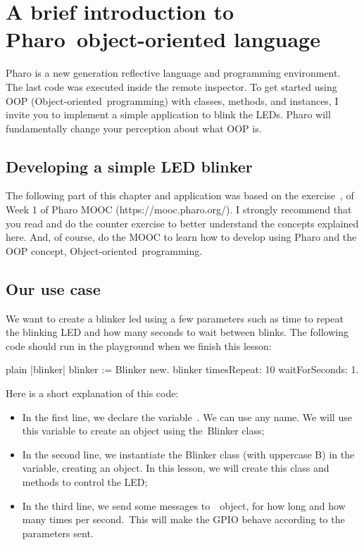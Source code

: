 \documentclass[10pt,twoside,english]{_support/latex/sbabook/sbabook}
\begin{document}
\frontmatter
\pagestyle{plain}

\tableofcontents*
\clearpage\listoffigures

\mainmatter

\chapter{A brief introduction to Pharo object-oriented language}
Pharo is a new generation reflective language and programming environment. The last code was executed inside the remote inspector. To get started using OOP (Object-oriented programming) with classes, methods, and instances, I invite you to implement a simple application to blink the LEDs.
Pharo will fundamentally change your perception about what OOP is.
\section{Developing a simple LED blinker}
The following part of this chapter and application was based on the exercise , of Week 1 of Pharo MOOC (https://mooc.pharo.org/). I strongly recommend that you read and do the counter exercise to better understand the concepts explained here. And, of course, do the MOOC to learn how to develop using Pharo and the OOP concept, Object-oriented programming.
\section{Our use case}
We want to create a blinker led using a few parameters such as time to repeat the blinking LED and how many seconds to wait between blinks. The following code should run in the playground when we finish this lesson:

\begin{displaycode}{plain}
|blinker|
blinker := Blinker new.
blinker timesRepeat: 10 waitForSeconds: 1.
\end{displaycode}

Here is a short explanation of this code:

\begin{itemize}
\item In the first line, we declare the variable . We can use any name. We will use this variable to create an object using the Blinker class;
\item In the second line, we instantiate the Blinker class (with uppercase B) in the  variable, creating an object. In this lesson, we will create this class and methods to control the LED;
\item In the third line, we send some messages to  object, for how long and how many times per second. This will make the GPIO behave according to the parameters sent.
\end{itemize}
\end{document}
